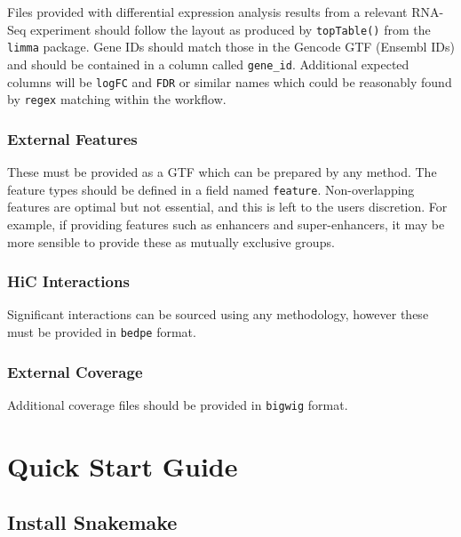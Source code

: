 \documentclass[
]{book}
\begin{document}
Files provided with differential expression analysis results from a relevant RNA-Seq experiment should follow the layout as produced by \texttt{topTable()} from the \texttt{limma} package\citep{limma}.
Gene IDs should match those in the Gencode GTF (Ensembl IDs) and should be contained in a column called \texttt{gene\_id}.
Additional expected columns will be \texttt{logFC} and \texttt{FDR} or similar names which could be reasonably found by \texttt{regex} matching within the workflow.

\hypertarget{external-features}{%
\subsection{External Features}\label{external-features}}

These must be provided as a GTF which can be prepared by any method.
The feature types should be defined in a field named \texttt{feature}.
Non-overlapping features are optimal but not essential, and this is left to the users discretion.
For example, if providing features such as enhancers and super-enhancers\citep{rose}, it may be more sensible to provide these as mutually exclusive groups.

\hypertarget{hic-interactions}{%
\subsection{HiC Interactions}\label{hic-interactions}}

Significant interactions can be sourced using any methodology, however these must be provided in \texttt{bedpe} format.

\hypertarget{external-coverage}{%
\subsection{External Coverage}\label{external-coverage}}

Additional coverage files should be provided in \texttt{bigwig} format.

\hypertarget{quick-start}{%
\chapter{Quick Start Guide}\label{quick-start}}

\hypertarget{snakemake}{%
\section{Install Snakemake}\label{snakemake}}
\end{document}
